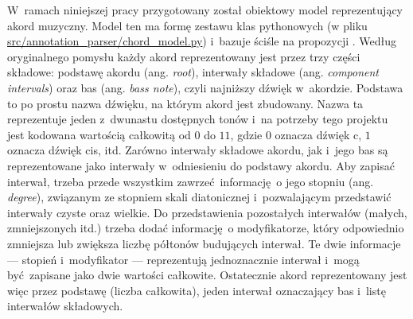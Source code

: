 W~ramach niniejszej pracy przygotowany został obiektowy model reprezentujący akord muzyczny. Model ten ma formę zestawu klas pythonowych (w pliku \url{src/annotation_parser/chord_model.py}) i~bazuje ściśle na propozycji \cite{harte_towards_nodate}. Według oryginalnego pomysłu każdy akord reprezentowany jest przez trzy części składowe: podstawę akordu (ang. \emph{root}), interwały składowe (ang. \emph{component intervals}) oraz bas (ang. \emph{bass note}), czyli najniższy dźwięk w~akordzie. Podstawa to po prostu nazwa dźwięku, na którym akord jest zbudowany. Nazwa ta reprezentuje jeden z~dwunastu dostępnych tonów i~na potrzeby tego projektu jest kodowana wartością całkowitą od $0$ do $11$, gdzie $0$ oznacza dźwięk c, $1$ oznacza dźwięk cis, itd. Zarówno interwały składowe akordu, jak i~jego bas są reprezentowane jako interwały w~odniesieniu do podstawy akordu.  Aby zapisać interwał, trzeba przede wszystkim zawrzeć informację o jego stopniu (ang.  \emph{degree}), związanym ze stopniem skali diatonicznej i~pozwalającym przedstawić interwały czyste oraz wielkie. Do przedstawienia pozostałych interwałów (małych, zmniejszonych itd.) trzeba dodać informację o modyfikatorze, który odpowiednio zmniejsza lub zwiększa liczbę półtonów budujących interwał. Te dwie informacje --- stopień i~modyfikator --- reprezentują jednoznacznie interwał i~mogą być zapisane jako dwie wartości całkowite. Ostatecznie akord reprezentowany jest więc przez podstawę (liczba całkowita), jeden interwał oznaczający bas i~listę interwałów składowych.

